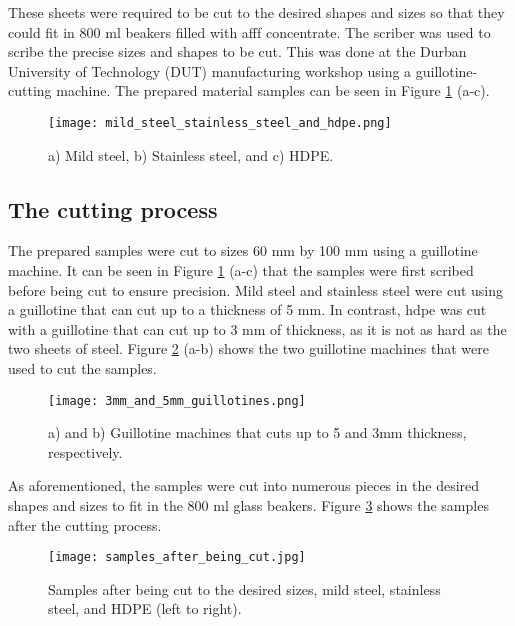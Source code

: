 These sheets were required to be cut to the desired shapes and sizes so that they could fit in 800 ml beakers filled with \acrshort{afff} concentrate. The scriber was used to scribe the precise sizes and shapes to be cut. This was done at the Durban University of Technology (DUT) manufacturing workshop using a guillotine-cutting machine. The prepared material samples can be seen in Figure \ref{ch4:figure:samples} (a-c).

\begin{figure}[H]
    \centering
    \texttt{[image: mild\_steel\_stainless\_steel\_and\_hdpe.png]}
    \caption{a) Mild steel, b) Stainless steel, and c) HDPE.}
    \label{ch4:figure:samples}
\end{figure}

\subsection{The cutting process}
The prepared samples were cut to sizes 60 mm by 100 mm using a guillotine machine. It can be seen in Figure \ref{ch4:figure:samples} (a-c) that the samples were first scribed before being cut to ensure precision. Mild steel and stainless steel were cut using a guillotine that can cut up to a thickness of 5 mm. In contrast, \acrshort{hdpe} was cut with a guillotine that can cut up to 3 mm of thickness, as it is not as hard as the two sheets of steel. Figure \ref{ch4:figure:guillotines} (a-b) shows the two guillotine machines that were used to cut the samples.

\begin{figure}[H]
    \centering
    \texttt{[image: 3mm\_and\_5mm\_guillotines.png]}
    \caption{a) and b) Guillotine machines that cuts up to 5 and 3mm thickness, respectively.}
    \label{ch4:figure:guillotines}
\end{figure}

As aforementioned, the samples were cut into numerous pieces in the desired shapes and sizes to fit in the 800 ml glass beakers. Figure \ref{ch4:figure:samples_cut} shows the samples after the cutting process.

\begin{figure}[H]
    \centering
    \texttt{[image: samples\_after\_being\_cut.jpg]}
    \caption{Samples after being cut to the desired sizes, mild steel, stainless steel, and HDPE (left to right).}
    \label{ch4:figure:samples_cut}
\end{figure}

